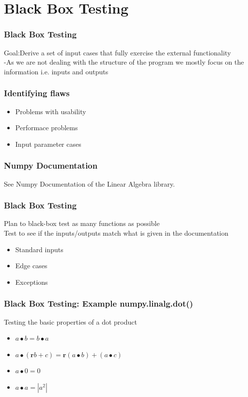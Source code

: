 \documentclass{beamer}
\begin{document}
\section{Black Box Testing}
\begin{frame}\frametitle{Black Box Testing} 
Goal:Derive a set of input cases that fully exercise the external functionality\\

-As we are not dealing with the structure of the program we mostly focus on the information i.e. inputs and outputs
\end{frame}

\begin{frame}\frametitle{Identifying flaws} 
\begin{itemize}
\item Problems with usability
\item Performace problems
\item Input parameter cases
\end{itemize}
\end{frame}

\begin{frame}\frametitle{Numpy Documentation} 
	See Numpy Documentation of the Linear Algebra library.
\end{frame}


\begin{frame}\frametitle{Black Box Testing} 
Plan to black-box test as many functions as possible\\
Test to see if the inputs/outputs match what is given in the documentation
\begin{itemize}
\item Standard inputs
\item Edge cases
\item Exceptions 
\end{itemize}
\end{frame}

\begin{frame}\frametitle{Black Box Testing: Example numpy.linalg.dot()} 
Testing the basic properties of a dot product 
\begin{itemize}
	\item $ a \bullet b = b \bullet a $
	\item $ a \bullet (\textbf{r}b + c) = \textbf{r}(a \bullet b) + (a \bullet c) $
	\\
	\item $ a \bullet 0 = 0 $
	\item $ a \bullet a = | a^2 |$
\end{itemize}
\end{frame}
\end{document}
